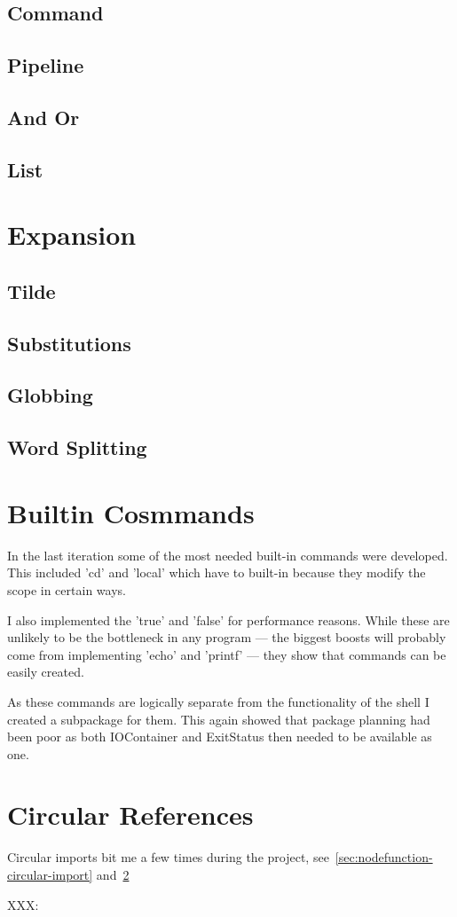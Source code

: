 \subsection{Command}
\subsection{Pipeline}
\subsection{And Or}
\subsection{List}

\section{Expansion}

\subsection{Tilde}
\subsection{Substitutions}
\subsection{Globbing}
\subsection{Word Splitting}

\section{Builtin Cosmmands}
\label{sec:builtins}
In the last iteration some of the most needed built-in commands were developed.
This included 'cd' and 'local' which have to built-in because they modify the scope in certain ways. 

I also implemented the 'true' and 'false' for performance reasons.
While these are unlikely to be the bottleneck in any program --- the biggest boosts will probably come from implementing 'echo' and 'printf' --- they show that commands can be easily created.

As these commands are logically separate from the functionality of the shell I created a subpackage for them.
This again showed that package planning had been poor as both IOContainer and ExitStatus then needed to be available as one.

\section{Circular References}
\label{sec:circular-refs}
Circular imports bit me a few times during the project, see~\ref{sec:nodefunction-circular-import} and~\ref{sec:builtins}



XXX: %